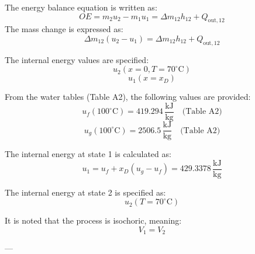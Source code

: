 The energy balance equation is written as:  
\[
OE = m_2 u_2 - m_1 u_1 = \Delta m_{12} h_{12} + Q_{\text{out},12}
\]  
The mass change is expressed as:  
\[
\Delta m_{12} (u_2 - u_1) = \Delta m_{12} h_{12} + Q_{\text{out},12}
\]  

The internal energy values are specified:  
\[
u_2 (x = 0, T = 70^\circ\text{C})
\]  
\[
u_1 (x = x_D)
\]  

From the water tables (Table A2), the following values are provided:  
\[
u_f (100^\circ\text{C}) = 419.294 \, \frac{\text{kJ}}{\text{kg}} \quad \text{(Table A2)}
\]  
\[
u_g (100^\circ\text{C}) = 2506.5 \, \frac{\text{kJ}}{\text{kg}} \quad \text{(Table A2)}
\]  

The internal energy at state 1 is calculated as:  
\[
u_1 = u_f + x_D (u_g - u_f) = 429.3378 \, \frac{\text{kJ}}{\text{kg}}
\]  

The internal energy at state 2 is specified as:  
\[
u_2 (T = 70^\circ\text{C})
\]  

It is noted that the process is isochoric, meaning:  
\[
V_1 = V_2
\]  

---